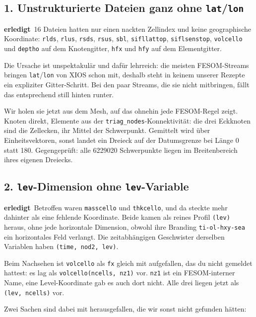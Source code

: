 \documentclass[11pt,a4paper]{article}
\newcommand{\code}[1]{\texttt{\small #1}}
\newcommand{\ok}{\textcolor{green!45!black}{\textbf{erledigt}}}
\begin{document}
\subsection*{1. Unstrukturierte Dateien ganz ohne \code{lat}/\code{lon}}
\ok\ 16 Dateien hatten nur einen nackten Zellindex und keine geographische
Koordinate: \code{rlds}, \code{rlus}, \code{rsds}, \code{rsus}, \code{sbl},
\code{sifllattop}, \code{siflsenstop}, \code{volcello} und \code{deptho} auf dem
Knotengitter, \code{hfx} und \code{hfy} auf dem Elementgitter.

Die Ursache ist unspektakul\"ar und daf\"ur lehrreich: die meisten FESOM-Streams
bringen \code{lat}/\code{lon} von XIOS schon mit, deshalb steht in keinem unserer
Rezepte ein expliziter Gitter-Schritt. Bei den paar Streams, die sie nicht
mitbringen, f\"allt das entsprechend still hinten runter.

Wir holen sie jetzt aus dem Mesh, auf das ohnehin jede FESOM-Regel zeigt. Knoten
direkt, Elemente aus der \code{triag\_nodes}-Konnektivit\"at: die drei Eckknoten
sind die Zellecken, ihr Mittel der Schwerpunkt. Gemittelt wird \"uber
Einheitsvektoren, sonst landet ein Dreieck auf der Datumsgrenze bei
L\"ange 0 statt 180. Gegengepr\"uft: alle 6229020 Schwerpunkte liegen im
Breitenbereich ihres eigenen Dreiecks.

\subsection*{2. \code{lev}-Dimension ohne \code{lev}-Variable}
\ok\ Betroffen waren \code{masscello} und \code{thkcello}, und da steckte mehr
dahinter als eine fehlende Koordinate. Beide kamen als reines Profil
\code{(lev)} heraus, ohne jede horizontale Dimension, obwohl ihre Branding
\code{ti-ol-hxy-sea} ein horizontales Feld verlangt. Die zeitabh\"angigen
Geschwister derselben Variablen haben \code{(time, nod2, lev)}.

Beim Nachsehen ist \code{volcello} als \code{fx} gleich mit aufgefallen, das du
nicht gemeldet hattest: es lag als \code{volcello(ncells, nz1)} vor.
\code{nz1} ist ein FESOM-interner Name, eine Level-Koordinate gab es auch dort
nicht. Alle drei liegen jetzt als \code{(lev, ncells)} vor.

Zwei Sachen sind dabei mit herausgefallen, die wir sonst nicht gefunden h\"atten:
\end{document}
